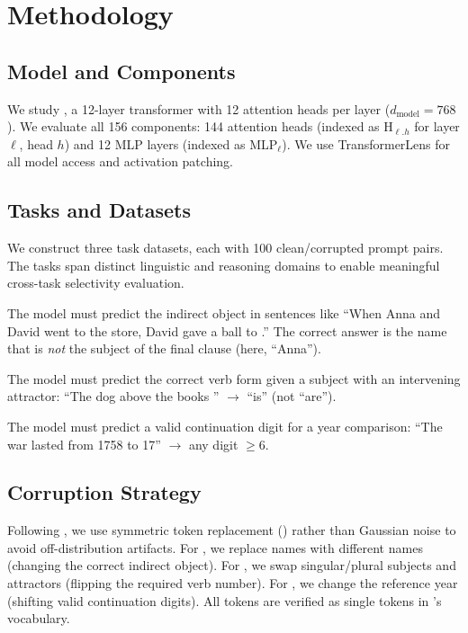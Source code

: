 \section{Methodology}
\label{sec:method}

\subsection{Model and Components}
\label{sec:model}

We study \gptsmall \citep{radford2019language}, a 12-layer transformer with 12 attention heads per layer ($d_\text{model} = 768$). We evaluate all 156 components: 144 attention heads (indexed as H$_{\ell.h}$ for layer $\ell$, head $h$) and 12 MLP layers (indexed as MLP$_\ell$). We use TransformerLens for all model access and activation patching.

\subsection{Tasks and Datasets}
\label{sec:tasks}

We construct three task datasets, each with 100 clean/corrupted prompt pairs. The tasks span distinct linguistic and reasoning domains to enable meaningful cross-task selectivity evaluation.

 The model must predict the indirect object in sentences like ``When Anna and David went to the store, David gave a ball to \underline{\hspace{1em}}.'' The correct answer is the name that is \emph{not} the subject of the final clause (here, ``Anna'').

 The model must predict the correct verb form given a subject with an intervening attractor: ``The dog above the books \underline{\hspace{1em}}'' $\rightarrow$ ``is'' (not ``are'').

 The model must predict a valid continuation digit for a year comparison: ``The war lasted from 1758 to 17\underline{\hspace{1em}}'' $\rightarrow$ any digit $\geq 6$.

\subsection{Corruption Strategy}
\label{sec:corruption}

Following \citet{zhang2023best}, we use symmetric token replacement (\str) rather than Gaussian noise to avoid off-distribution artifacts. For \ioi, we replace names with different names (changing the correct indirect object). For \sva, we swap singular/plural subjects and attractors (flipping the required verb number). For \gt, we change the reference year (shifting valid continuation digits). All tokens are verified as single tokens in \gptsmall's vocabulary.

